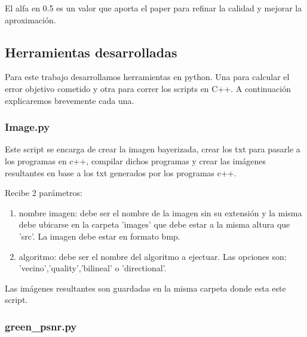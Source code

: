 

El alfa en 0.5 es un valor que aporta el paper para refinar la calidad y mejorar la aproximación.
\clearpage
\subsection{Herramientas desarrolladas}

Para este trabajo desarrollamos herramientas en python. Una para calcular el error objetivo cometido y otra para correr los scripts en C++. A continuación explicaremos brevemente cada una.

\subsubsection{Image.py}

Este script se encarga de crear la imagen bayerizada, crear los txt para pasarle a los programas en c++, compilar dichos programas y crear las imágenes resultantes en base a los txt generados por los programas c++.

Recibe 2 parámetros:
\begin{enumerate}
\item nombre imagen: debe ser el nombre de la imagen sin su extensi\'on y la misma debe ubicarse en la carpeta 'images' que debe estar a la misma altura que 'src'. La imagen debe estar en formato bmp.
\item algoritmo: debe ser el nombre del algoritmo a ejectuar. Las opciones son: 'vecino','quality','bilineal' o 'directional'.
\end{enumerate}

Las imágenes resultantes son guardadas en la misma carpeta donde esta este script.

\subsubsection{green\_psnr.py}

